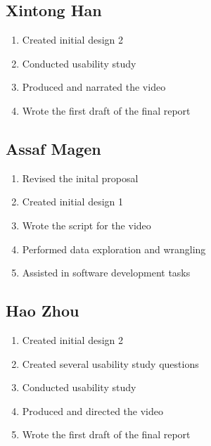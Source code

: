 \documentclass{sigchi}
\begin{document}
\subsection{Xintong Han}

\begin{enumerate}
    \item Created initial design 2
    \item Conducted usability study
    \item Produced and narrated the video
    \item Wrote the first draft of the final report
\end{enumerate}

\subsection{Assaf Magen}

\begin{enumerate}
    \item Revised the inital proposal
    \item Created initial design 1
    \item Wrote the script for the video
    \item Performed data exploration and wrangling
    \item Assisted in software development tasks
\end{enumerate}

\subsection{Hao Zhou}

\begin{enumerate}
    \item Created initial design 2
    \item Created several usability study questions
    \item Conducted usability study
    \item Produced and directed the video
    \item Wrote the first draft of the final report
\end{enumerate}
\end{document}
